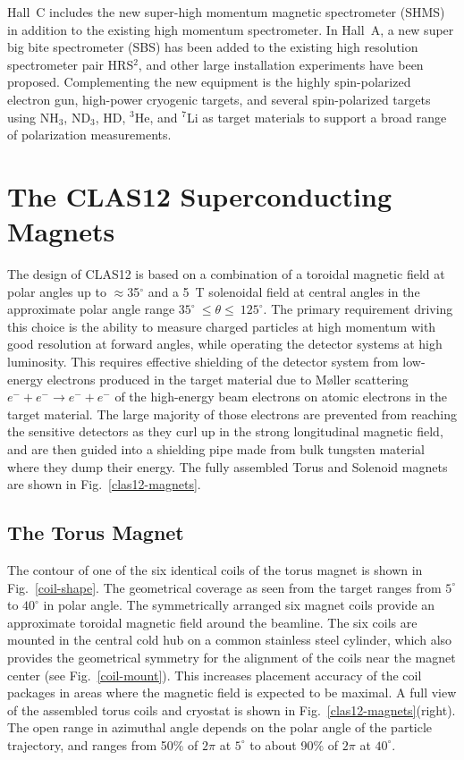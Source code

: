 \documentclass[final,3p,twocolumn]{elsarticle}
\begin{document}
Hall~C includes the new super-high momentum magnetic spectrometer (SHMS) in addition to the existing high
momentum spectrometer. In Hall~A, a new super big bite spectrometer (SBS) has been added to the
existing high resolution spectrometer pair HRS$^2$, and other large installation experiments have been proposed.
Complementing the new equipment is the highly spin-polarized electron gun, high-power cryogenic targets, and
several spin-polarized targets using NH$_3$, ND$_3$, HD, $^3$He, and $^7$Li as target materials to support a
broad range of polarization measurements.   


\section{The CLAS12 Superconducting Magnets}

The design of CLAS12 is based on a combination of a toroidal magnetic field at polar angles up to $\approx$35$^\circ$
and a 5~T solenoidal field at central angles in the approximate polar angle range $35^\circ~\le \theta \le~125^\circ$.
The primary requirement driving this choice is the ability to measure charged particles at high momentum with good
resolution at forward angles, while operating the detector systems at high luminosity. This requires effective
shielding of the detector system from low-energy electrons produced in the target material due to M{\o}ller
scattering $e^- + e^- \to e^- + e^-$ of the high-energy beam electrons on atomic electrons in the target material.
The large majority of those electrons are prevented from reaching the sensitive detectors as they curl up in the
strong longitudinal magnetic field, and are then guided into a shielding pipe made from bulk tungsten material where
they dump their energy. The fully assembled Torus and Solenoid magnets are shown in Fig.~\ref{clas12-magnets}.

\subsection{The Torus Magnet}
\label{torus}

The contour of one of the six identical coils of the torus magnet is shown in Fig.~\ref{coil-shape}. The geometrical
coverage as seen from the target ranges from $5^\circ$ to $40^\circ$ in polar angle. The symmetrically arranged six
magnet coils provide an approximate toroidal magnetic field around the beamline. The six coils are mounted in the
central cold hub on a common stainless steel cylinder, which also provides the geometrical symmetry for the alignment
of the coils near the magnet center (see Fig.~\ref{coil-mount}). This increases placement accuracy of the coil
packages in areas where the magnetic field is expected to be maximal. A full view of the assembled torus coils and
cryostat is shown in Fig.~\ref{clas12-magnets}(right). The open range in azimuthal angle depends on the polar angle
of the particle trajectory, and ranges from 50\% of $2\pi$ at $5^\circ$ to about 90\% of $2\pi$ at $40^\circ$.
\end{document}
